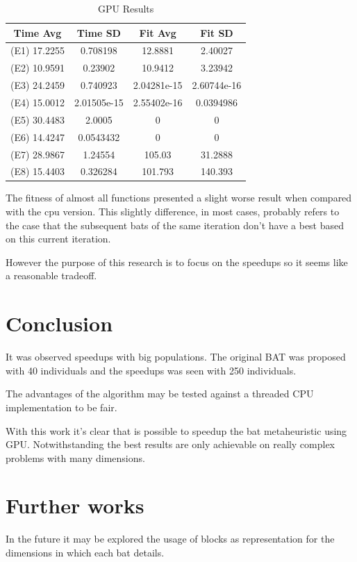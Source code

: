 \documentclass[conference]{IEEEtran}
\begin{document}
\begin{table}[!t]
    \renewcommand{\arraystretch}{1.3}
    \caption{GPU Results}
    \label{results-gpu}
    \centering
    \begin{tabular}{c|c|c|c}
    \hline
        Time Avg & Time SD & Fit Avg & Fit SD\\
    \hline
        (E1) 17.2255  & 0.708198 &  12.8881 & 2.40027 \\
        (E2) 10.9591  & 0.23902 & 10.9412 & 3.23942 \\
        (E3) 24.2459  & 0.740923  & 2.04281e-15 & 2.60744e-16 \\
        (E4) 15.0012 & 2.01505e-15 & 2.55402e-16 & 0.0394986 \\
        (E5) 30.4483  & 2.0005    & 0 & 0 \\
        (E6) 14.4247 & 0.0543432 & 0 & 0 \\
        (E7) 28.9867 & 1.24554 & 105.03 & 31.2888 \\
        (E8) 15.4403 & 0.326284 & 101.793 & 140.393 \\
    \end{tabular}
\end{table}

The fitness of almost all functions presented a slight worse result
when compared with the cpu version. This slightly difference, in most
cases, probably refers to the case that the subsequent bats of the same
iteration don't have a best based on this current iteration.

However the purpose of this research is to focus on the speedups so it
seems like a reasonable tradeoff.


\section{Conclusion} %
It was observed speedups with big populations. The original BAT was
proposed with 40 individuals and the speedups was seen with 250
individuals.

The advantages of the algorithm may be tested against a threaded CPU
implementation to be fair.

With this work it's clear that is possible to speedup the bat
metaheuristic using GPU. Notwithstanding the best results are only
achievable on really complex problems with many dimensions.

\section{Further works} %
In the future it may be explored the usage of blocks as representation
for the dimensions in which each bat details.
\end{document}
